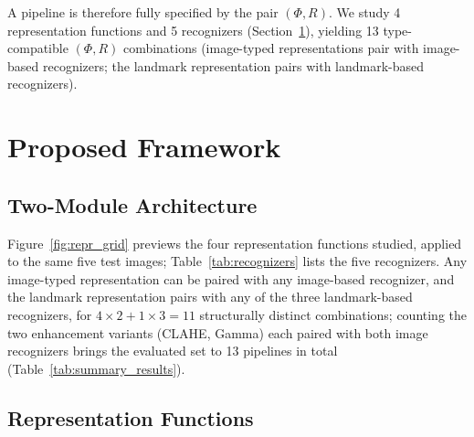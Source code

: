 \documentclass[11pt,a4paper]{article}
\begin{document}
A pipeline is therefore fully specified by the pair $(\Phi, R)$. We study
4 representation functions and 5 recognizers (Section~\ref{sec:methods}),
yielding 13 type-compatible $(\Phi, R)$ combinations (image-typed
representations pair with image-based recognizers; the landmark
representation pairs with landmark-based recognizers).

\section{Proposed Framework}
\label{sec:methods}

\subsection{Two-Module Architecture}

Figure~\ref{fig:repr_grid} previews the four representation functions studied,
applied to the same five test images; Table~\ref{tab:recognizers} lists the
five recognizers. Any image-typed representation can be paired with any
image-based recognizer, and the landmark representation pairs with any of the
three landmark-based recognizers, for $4\times2 + 1\times3 = 11$ structurally
distinct combinations; counting the two enhancement variants (CLAHE, Gamma)
each paired with both image recognizers brings the evaluated set to 13
pipelines in total (Table~\ref{tab:summary_results}).

\subsection{Representation Functions}
\end{document}
